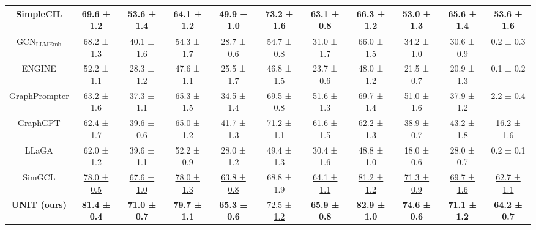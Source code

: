 \documentclass[sigconf]{acmart}
\begin{document}
\begin{table}
\begin{tabular}{ccccccccccc}
SimpleCIL & 69.6 ± 1.2 & 53.6 ± 1.4 & 64.1 ± 1.2 & 49.9 ± 1.0 & \textbf{73.2 ± 1.6} & 63.1 ± 0.8 & 66.3 ± 1.2 & 53.0 ± 1.3 & 65.6 ± 1.4 & 53.6 ± 1.6 \\
\midrule
GCN$_{\text{LLMEmb}}$ & 68.2 ± 1.3 & 40.1 ± 1.6 & 54.3 ± 1.7 & 28.7 ± 0.6 & 54.7 ± 0.8 & 31.0 ± 1.7 & 66.0 ± 1.5 & 34.2 ± 1.0 & 30.6 ± 0.9 & 0.2 ± 0.3 \\
ENGINE & 52.2 ± 1.1 & 28.3 ± 1.2 & 47.6 ± 1.1 & 25.5 ± 1.7 & 46.8 ± 1.5 & 23.7 ± 0.6 & 48.0 ± 1.2 & 21.5 ± 0.7 & 20.9 ± 1.3 & 0.1 ± 0.2 \\
GraphPrompter & 63.2 ± 1.6 & 37.3 ± 1.1 & 65.3 ± 1.5 & 34.5 ± 1.4 & 69.5 ± 0.8 & 51.6 ± 1.3 & 69.7 ± 1.4 & 51.0 ± 1.6 & 37.9 ± 1.2 & 2.2 ± 0.4 \\
GraphGPT & 62.4 ± 1.7 & 39.6 ± 0.6 & 65.0 ± 1.2 & 41.7 ± 1.3 & 71.2 ± 1.1 & 61.6 ± 1.5 & 62.2 ± 1.3 & 38.9 ± 0.7 & 43.2 ± 1.8 & 16.2 ± 1.6 \\
LLaGA  & 62.0 ± 1.2 & 39.6 ± 1.1 & 52.2 ± 0.9 & 28.0 ± 1.2 & 49.4 ± 1.3 & 30.4 ± 1.6 & 48.8 ± 1.0 & 18.0 ± 0.6 & 28.0 ± 0.7 & 0.2 ± 0.1 \\
SimGCL & \underline{78.0 ± 0.5} & \underline{67.6 ± 1.0} & \underline{78.0 ± 1.3} & \underline{63.8 ± 0.8} & 68.8 ± 1.9 & \underline{64.1 ± 1.1} & \underline{81.2 ± 1.2} & \underline{71.3 ± 0.9} & \underline{69.7 ± 1.6} & \underline{62.7 ± 1.1} \\
\midrule
\textbf{UNIT (ours) } & \textbf{81.4 ± 0.4} & \textbf{71.0 ± 0.7} & \textbf{79.7 ± 1.1} & \textbf{65.3 ± 0.6} & \underline{72.5 ± 1.2} & \textbf{65.9 ± 0.8} & \textbf{82.9 ± 1.0} & \textbf{74.6 ± 0.6} & \textbf{71.1 ± 1.2} & \textbf{64.2 ± 0.7} \\
\bottomrule
\end{tabular}
\label{few_shot}
\end{table}
\end{document}
